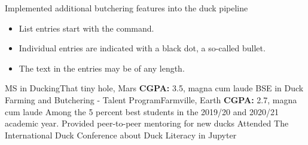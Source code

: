 \documentclass[
    10pt,
    A4,
    english,
    draft = false,
    twoside = false,
]{article}
\begin{document}
	{Implemented additional butchering features into the duck pipeline}
 
	{\begin{itemize}
  \item List entries start with the command.
  \item Individual entries are indicated with a black dot, a so-called bullet.
  \item The text in the entries may be of any length.
\end{itemize}
}
	
	{MS in Ducking}{That tiny hole, Mars}
	{\textbf{CGPA:} 3.5, magna cum laude}
	{BSE in Duck Farming and Butchering - Talent Program}{Farmville, Earth}
	{\textbf{CGPA:} 2.7, magna cum laude}
	{Among the 5 percent best students in the 2019/20 and 2020/21 academic year.}
	{Provided peer-to-peer mentoring for new ducks}
	{Attended The International Duck Conference about Duck Literacy in Jupyter}
\end{document}
